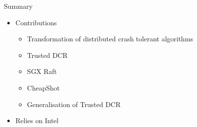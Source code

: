 \documentclass{beamer}
\begin{document}
\begin{frame}{Summary}%
\begin{itemize}
	\item Contributions
	\begin{itemize}
		\item Transformation of distributed crash tolerant algorithms
		\item Trusted DCR
		\item SGX Raft
		\item CheapShot
		\item Generalisation of Trusted DCR
	\end{itemize}
	\item Relies on Intel
\end{itemize}
\end{frame}
\end{document}
